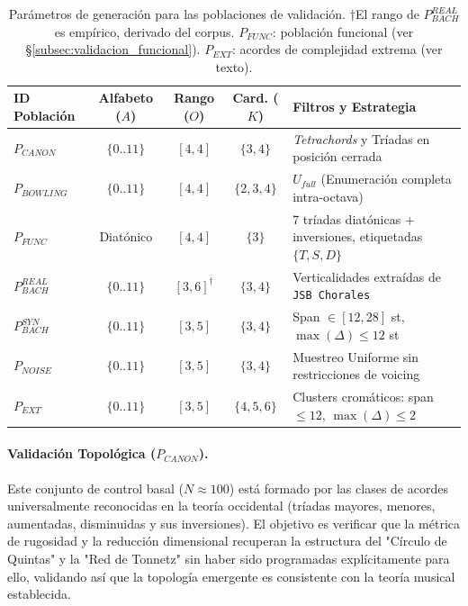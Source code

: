 \begin{table}[h]
\centering
\small
\renewcommand{\arraystretch}{1.2}
\begin{tabular}{|l|c|c|c|l|}
\hline
\textbf{ID Población} & \textbf{Alfabeto ($A$)} & \textbf{Rango ($O$)} & \textbf{Card. ($K$)} & \textbf{Filtros y Estrategia} \\ \hline
$P_{CANON}$ & $\{0..11\}$ & $[4, 4]$ & $\{3, 4\}$ & \textit{Tetrachords} y Tríadas en posición cerrada \\ \hline
$P_{BOWLING}$ & $\{0..11\}$ & $[4, 4]$ & $\{2, 3, 4\}$ & $U_{full}$ (Enumeración completa intra-octava) \\ \hline
$P_{FUNC}$ & Diatónico & $[4, 4]$ & $\{3\}$ & 7 tríadas diatónicas + inversiones, etiquetadas $\{T, S, D\}$ \\ \hline
$P_{BACH}^{REAL}$ & $\{0..11\}$ & $[3, 6]^\dagger$ & $\{3, 4\}$ & Verticalidades extraídas de \texttt{JSB Chorales} \\ \hline
$P_{BACH}^{SYN}$ & $\{0..11\}$ & $[3, 5]$ & $\{3, 4\}$ & Span $\in [12, 28]$ st, $\max(\Delta) \le 12$ st \\ \hline
$P_{NOISE}$ & $\{0..11\}$ & $[3, 5]$ & $\{3, 4\}$ & Muestreo Uniforme sin restricciones de voicing \\ \hline
$P_{EXT}$ & $\{0..11\}$ & $[3, 5]$ & $\{4, 5, 6\}$ & Clusters cromáticos: span $\le 12$, $\max(\Delta) \le 2$ \\ \hline
\end{tabular}
\caption{Parámetros de generación para las poblaciones de validación. $\dagger$El rango de $P_{BACH}^{REAL}$ es empírico, derivado del corpus. $P_{FUNC}$: población funcional (ver §\ref{subsec:validacion_funcional}). $P_{EXT}$: acordes de complejidad extrema (ver texto).}
\label{tab:poblaciones_params}
\end{table}

\paragraph{Validación Topológica ($P_{CANON}$).}
Este conjunto de control basal ($N \approx 100$) está formado por las clases de acordes universalmente reconocidas en la teoría occidental (tríadas mayores, menores, aumentadas, disminuidas y sus inversiones). El objetivo es verificar que la métrica de rugosidad y la reducción dimensional recuperan la estructura del "Círculo de Quintas" y la "Red de Tonnetz" sin haber sido programadas explícitamente para ello, validando así que la topología emergente es consistente con la teoría musical establecida.

